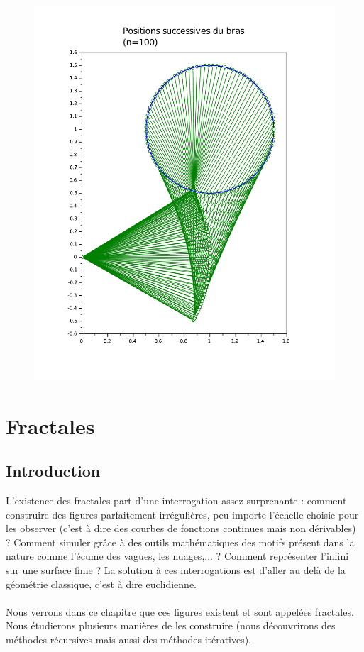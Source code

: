 \documentclass[a4paper,10pt]{report}
\begin{document}
\begin{figure}[H]
\begin{minipage}[c]{.48\linewidth}
   \centering
      \includegraphics[width=\textwidth]{graphcinematique_2.pdf}
   \end{minipage}
\label{affichage_cinematique}
\end{figure}

\chapter{Fractales}
\section{Introduction}
L'existence des fractales part d'une interrogation assez surprenante : comment construire des figures parfaitement irrégulières, peu importe l'échelle choisie pour les observer (c'est à dire des courbes de fonctions continues mais non dérivables) ? Comment simuler grâce à des outils mathématiques des motifs présent dans la nature comme l'écume des vagues, les nuages,... ? Comment représenter l'infini sur une surface finie ? La solution à ces interrogations est d'aller au delà de la géométrie classique, c'est à dire euclidienne. \\ \\
\indent Nous verrons dans ce chapitre que ces figures existent et sont appelées fractales. Nous étudierons plusieurs manières de les construire (nous découvrirons des méthodes récursives mais aussi des méthodes itératives).
\end{document}
